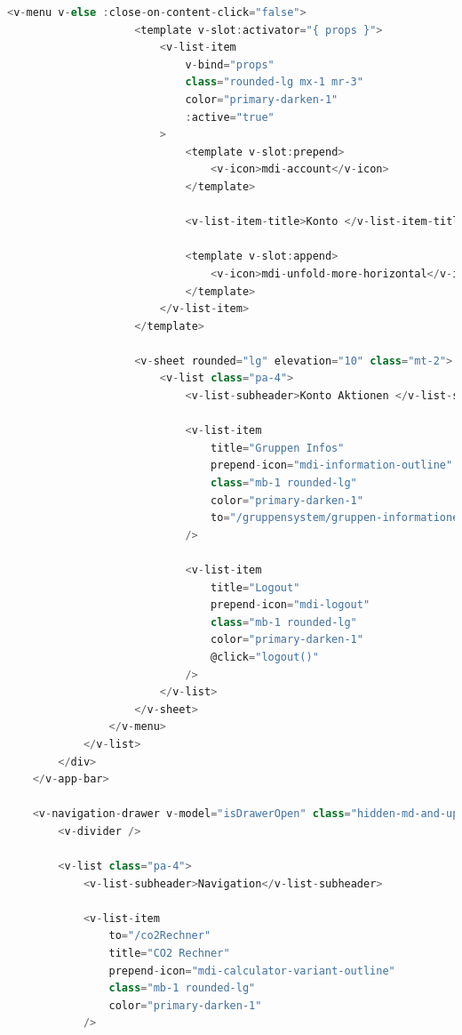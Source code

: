 \begin{lstlisting}[language={JavaScript}, caption={Navigationsleiste für Web als auch Mobile}]
                <v-menu v-else :close-on-content-click="false">
                    <template v-slot:activator="{ props }">
                        <v-list-item
                            v-bind="props"
                            class="rounded-lg mx-1 mr-3"
                            color="primary-darken-1"
                            :active="true"
                        >
                            <template v-slot:prepend>
                                <v-icon>mdi-account</v-icon>
                            </template>

                            <v-list-item-title>Konto </v-list-item-title>

                            <template v-slot:append>
                                <v-icon>mdi-unfold-more-horizontal</v-icon>
                            </template>
                        </v-list-item>
                    </template>

                    <v-sheet rounded="lg" elevation="10" class="mt-2">
                        <v-list class="pa-4">
                            <v-list-subheader>Konto Aktionen </v-list-subheader>

                            <v-list-item
                                title="Gruppen Infos"
                                prepend-icon="mdi-information-outline"
                                class="mb-1 rounded-lg"
                                color="primary-darken-1"
                                to="/gruppensystem/gruppen-informationen"
                            />

                            <v-list-item
                                title="Logout"
                                prepend-icon="mdi-logout"
                                class="mb-1 rounded-lg"
                                color="primary-darken-1"
                                @click="logout()"
                            />
                        </v-list>
                    </v-sheet>
                </v-menu>
            </v-list>
        </div>
    </v-app-bar>

    <v-navigation-drawer v-model="isDrawerOpen" class="hidden-md-and-up">
        <v-divider />

        <v-list class="pa-4">
            <v-list-subheader>Navigation</v-list-subheader>

            <v-list-item
                to="/co2Rechner"
                title="CO2 Rechner"
                prepend-icon="mdi-calculator-variant-outline"
                class="mb-1 rounded-lg"
                color="primary-darken-1"
            />


\end{lstlisting}
